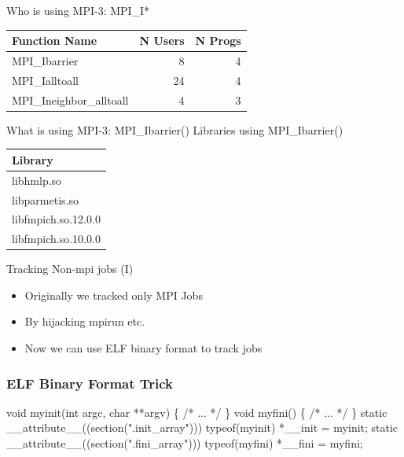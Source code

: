 \documentclass{beamer}
\begin{document}
\begin{frame}{Who is using MPI-3: MPI\_I*}
    \begin{tabular}{|l|r|r|}
        \hline
        Function Name            & N Users    & N Progs \\\hline\hline
        MPI\_Ibarrier            &  8         & 4       \\\hline
        MPI\_Ialltoall           & 24         & 4       \\\hline
        MPI\_Ineighbor\_alltoall &  4         & 3       \\\hline
    \end{tabular}

\end{frame}

\begin{frame}{What is using MPI-3: MPI\_Ibarrier()}
    Libraries using MPI\_Ibarrier()\\
    \begin{tabular}{|l|}
        \hline
        Library                  \\\hline\hline
        libhmlp.so               \\\hline
        libparmetis.so           \\\hline
        libfmpich.so.12.0.0      \\\hline
        libfmpich.so.10.0.0      \\\hline
    \end{tabular}

\end{frame}

\begin{frame}{Tracking Non-mpi jobs (I)}
  \begin{itemize}
    \item Originally we tracked only MPI Jobs
    \item By hijacking mpirun etc.
    \item Now we can use ELF binary format to track jobs
  \end{itemize}
\end{frame}

\begin{frame}[fragile]
    \frametitle{ELF Binary Format Trick}
 {\small
    \begin{semiverbatim}
void myinit(int argc, char **argv)
\{
  /* ... */
\}
void myfini()
\{
  /* ... */
\}
  static __attribute__((section(".init_array")))
       typeof(myinit) *__init = myinit;
  static __attribute__((section(".fini_array")))
       typeof(myfini) *__fini = myfini;
    \end{semiverbatim}
}
\end{frame}
\end{document}

